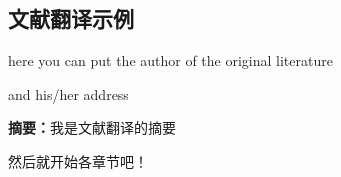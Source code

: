 \begin{Abstract}
\chapter*{文献翻译示例}
\begin{center}
\vspace{2mm}
{
 {\xiaosi here you can put the author of the original literature}

 {\xiaowu and his/her address}
}
\end{center}
{\wuhao \songti 
\noindent \textbf{摘要：}我是文献翻译的摘要

}
\end{Abstract}

然后就开始各章节吧！
%
%
%
